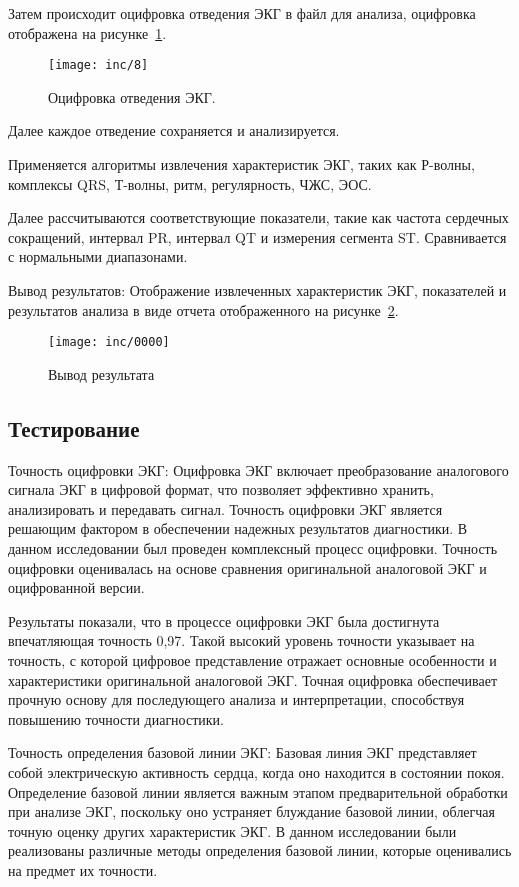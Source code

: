 Затем происходит оцифровка отведения ЭКГ в файл для анализа, оцифровка отображена на рисунке~\ref{fig:fig10}.

\begin{figure}
  \texttt{[image: inc/8]}
  \caption{Оцифровка отведения ЭКГ.}
  \label{fig:fig10}
\end{figure}

Далее каждое отведение сохраняется и анализируется.

Применяется алгоритмы извлечения характеристик ЭКГ, таких как Р-волны, комплексы QRS, Т-волны, ритм, регулярность, ЧЖС, ЭОС.

Далее рассчитываются соответствующие показатели, такие как частота сердечных сокращений, интервал PR, интервал QT и измерения сегмента ST.
Сравнивается с нормальными диапазонами.


Вывод результатов:
Отображение извлеченных характеристик ЭКГ, показателей и результатов анализа в виде отчета отображенного на рисунке~\ref{fig:fig11}.


\begin{figure}
  \texttt{[image: inc/0000]}
  \caption{Вывод результата}
  \label{fig:fig11}
\end{figure}

\subsection{Тестирование}

Точность оцифровки ЭКГ:
Оцифровка ЭКГ включает преобразование аналогового сигнала ЭКГ в цифровой формат, что позволяет эффективно хранить, анализировать и передавать сигнал. Точность оцифровки ЭКГ является решающим фактором в обеспечении надежных результатов диагностики. В данном исследовании был проведен комплексный процесс оцифровки. Точность оцифровки оценивалась на основе сравнения оригинальной аналоговой ЭКГ и оцифрованной версии.

Результаты показали, что в процессе оцифровки ЭКГ была достигнута впечатляющая точность 0,97. Такой высокий уровень точности указывает на точность, с которой цифровое представление отражает основные особенности и характеристики оригинальной аналоговой ЭКГ. Точная оцифровка обеспечивает прочную основу для последующего анализа и интерпретации, способствуя повышению точности диагностики.

Точность определения базовой линии ЭКГ:
Базовая линия ЭКГ представляет собой электрическую активность сердца, когда оно находится в состоянии покоя. Определение базовой линии является важным этапом предварительной обработки при анализе ЭКГ, поскольку оно устраняет блуждание базовой линии, облегчая точную оценку других характеристик ЭКГ. В данном исследовании были реализованы различные методы определения базовой линии, которые оценивались на предмет их точности.

